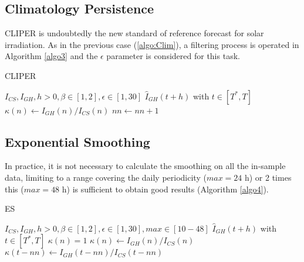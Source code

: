 \documentclass[preprint,12pt,3p]{elsarticle}
\begin{document}
 
  \subsection{Climatology Persistence}
 \label{algo:ClimPers}
CLIPER is undoubtedly the new standard of reference forecast for solar irradiation. As in the previous case (\ref{algo:Clim}), a filtering process is operated in Algorithm \ref{algo3} and  the $\epsilon$ parameter is considered for this task.
 
\begin{algorithm}
\caption{CLIPER}
\begin{algorithmic} 
\label{algo3}
\REQUIRE $ I_{CS}, I_{GH},h>0, \beta \in [1,2], \epsilon \in [1,30] $
\ENSURE $\widehat{I}_{GH}(t+h)$ with $t \in [T^*,T]$
\ELSE
\STATE $\kappa(n) \leftarrow I_{GH}(n)/I_{CS}(n)$
\ENDIF
\ENDFOR
{}
\REPEAT 
\STATE $nn\leftarrow nn+1$
\end{algorithmic}
\end{algorithm}
 
  \subsection{Exponential Smoothing}
 \label{algo:ES}
 In practice, it is not necessary to calculate the smoothing on all the in-sample data, limiting to a range covering the daily periodicity ($max = 24$ h) or 2 times this ($max = 48$ h) is sufficient to obtain good results (Algorithm \ref{algo4}).
 
 
\begin{algorithm}
\caption{ES}
\begin{algorithmic} 
\label{algo4}
\REQUIRE $ I_{CS}, I_{GH},h>0,\beta \in [1,2], \epsilon \in [1,30], max \in [10-48] $
\ENSURE $\widehat{I}_{GH}(t+h)$ with $t \in [T^*,T]$
\STATE$\kappa(n)=1$
\ELSE
\STATE $\kappa(n) \leftarrow I_{GH}(n)/I_{CS}(n)$
\ENDIF
\ENDFOR
{}
\ELSE
\STATE $\kappa(t-nn) \leftarrow I_{GH}(t-nn)/I_{CS}(t-nn)$
\ENDIF
\ENDFOR
{}
\end{algorithmic}
\end{algorithm}
 
\end{document}
